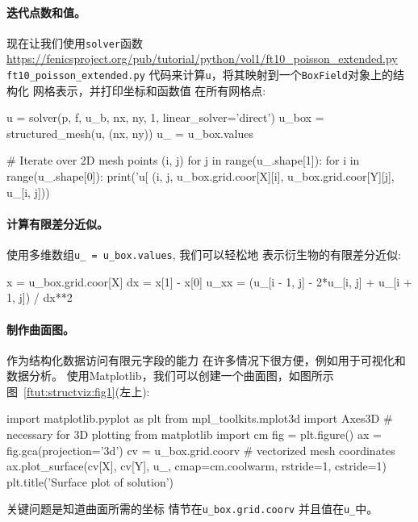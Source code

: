 \noindent
\paragraph{迭代点数和值。}
现在让我们使用\texttt{solver}函数
\url{https://fenicsproject.org/pub/tutorial/python/vol1/ft10_poisson_extended.py} {\nolinkurl{ft10_poisson_extended.py}}
代码来计算\texttt{u}，将其映射到一个\texttt{BoxField}对象上的结构化
网格表示，并打印坐标和函数值
在所有网格点:

\begin{python}
u = solver(p, f, u_b, nx, ny, 1, linear_solver='direct')
u_box = structured_mesh(u, (nx, ny))
u_ = u_box.values

# Iterate over 2D mesh points (i, j)
for j in range(u_.shape[1]):
    for i in range(u_.shape[0]):
        print('u[%
              (i, j,
               u_box.grid.coor[X][i], u_box.grid.coor[Y][j],
               u_[i, j]))
\end{python}

\paragraph{计算有限差分近似。}
使用多维数组\verb!u_ = u_box.values!, 我们可以轻松地
表示衍生物的有限差分近似:

\begin{python}
x = u_box.grid.coor[X]
dx = x[1] - x[0]
u_xx = (u_[i - 1, j] - 2*u_[i, j] + u_[i + 1, j]) / dx**2
\end{python}


\paragraph{制作曲面图。}
作为结构化数据访问有限元字段的能力
在许多情况下很方便，例如用于可视化和数据分析。
使用Matplotlib，我们可以创建一个曲面图，如图所示
图~\ref{ftut:structviz:fig1}(左上):

\begin{python}
import matplotlib.pyplot as plt
from mpl_toolkits.mplot3d import Axes3D  # necessary for 3D plotting
from matplotlib import cm
fig = plt.figure()
ax = fig.gca(projection='3d')
cv = u_box.grid.coorv  # vectorized mesh coordinates
ax.plot_surface(cv[X], cv[Y], u_, cmap=cm.coolwarm,
                rstride=1, cstride=1)
plt.title('Surface plot of solution')
\end{python}
关键问题是知道曲面所需的坐标
情节在\verb!u_box.grid.coorv! 并且值在\verb!u_!中。




